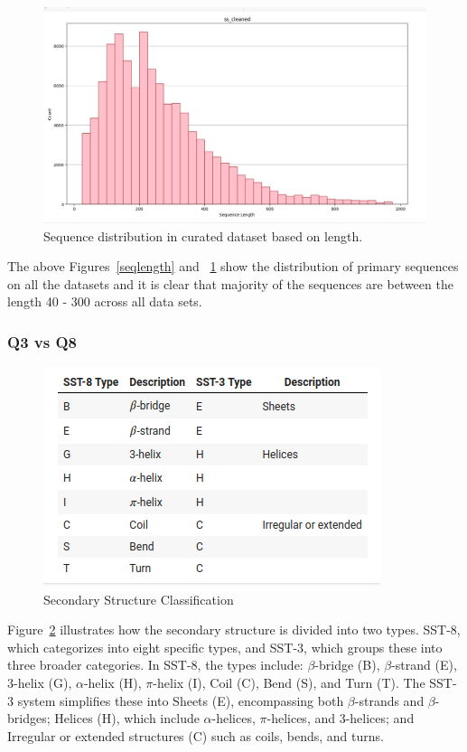 \documentclass[conference]{IEEEtran}
\begin{document}
\begin{figure}[hbtp]
\centerline{\includegraphics[width=\linewidth]{figs/seqlengthcleaned.png}}
\caption{
Sequence distribution in curated dataset based on length.
} 
\label{seqlengthcleaned}
\end{figure}
The above Figures~\ref{seqlength} and ~\ref{seqlengthcleaned} show the distribution of primary sequences on all the datasets and it is clear that majority of the sequences are between the length 40 - 300 across all data sets.

\subsubsection{Q3 vs Q8}
\begin{figure}[hbtp]
\centerline{\includegraphics[width=\linewidth]{figs/sst.png}}
\caption{
Secondary Structure Classification
} 
\label{sst}
\end{figure}

Figure~\ref{sst} illustrates how the secondary structure is divided into two types. SST-8, which categorizes into eight specific types, and SST-3, which groups these into three broader categories. In SST-8, the types include: $\beta$-bridge (B), $\beta$-strand (E), 3-helix (G), $\alpha$-helix (H), $\pi$-helix (I), Coil (C), Bend (S), and Turn (T). The SST-3 system simplifies these into Sheets (E), encompassing both $\beta$-strands and $\beta$-bridges; Helices (H), which include $\alpha$-helices, $\pi$-helices, and 3-helices; and Irregular or extended structures (C) such as coils, bends, and turns.
\end{document}
